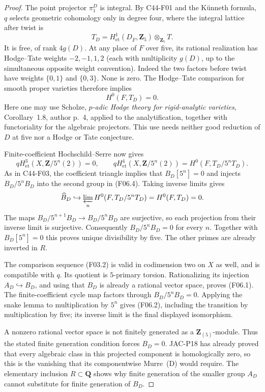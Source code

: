 \begin{proof}
The point projector $\pi_1^D$ is integral.  By C44-F01 and
the K\"unneth formula, $q$ selects geometric cohomology only in
degree four, where the integral lattice after twist is
\[
 T_D=H^1_{\mathrm{et}}(D_{\overline F},\mathbf Z_5)
                  \otimes_{\mathbf Z_5}T.
\]
It is free, of rank $4g(D)$.  At any place of $F$ over five,
its rational realization has Hodge--Tate weights
$-2,-1,1,2$ (each with multiplicity $g(D)$, up to the
simultaneous opposite weight convention).  Indeed the two
factors before twist have weights $\{0,1\}$ and $\{0,3\}$.
None is zero.  The Hodge--Tate comparison for smooth proper
varieties therefore implies
\[
                 H^0(F,T_D)=0.                 \tag{F06.3}
\]
Here one may use Scholze, \emph{$p$-adic Hodge theory for
rigid-analytic varieties}, Corollary~1.8, author p.~4, applied
to the analytification, together with functoriality for the
algebraic projectors.  This use needs neither good reduction
of $D$ at five nor a Hodge or Tate conjecture.

Finite-coefficient Hochschild--Serre now gives
\[
 qH^3_{\mathrm{et}}(X,\mathbf Z/5^n(2))=0,
 \qquad
 qH^4_{\mathrm{et}}(X,\mathbf Z/5^n(2))
       =H^0(F,T_D/5^nT_D).
                                                        \tag{F06.4}
\]
As in C44-F03, the coefficient triangle implies that
$B_D[5^n]=0$ and injects $B_D/5^nB_D$ into the second group
in (F06.4).  Taking inverse limits gives
\[
 \widehat B_D\hookrightarrow
        \varprojlim_n H^0(F,T_D/5^nT_D)
        =H^0(F,T_D)=0.
\]
The maps $B_D/5^{n+1}B_D\to B_D/5^nB_D$ are surjective,
so each projection from their inverse limit is surjective.
Consequently $B_D/5^nB_D=0$ for every $n$.  Together with
$B_D[5^n]=0$ this proves unique divisibility by five.
The other primes are already inverted in $R$.

The comparison sequence (F03.2) is valid in codimension two
on $X$ as well, and is compatible with $q$.  Its quotient
is $5$-primary torsion.  Rationalizing its injection
$A_D\hookrightarrow B_D$, and using that $B_D$ is already
a rational vector space, proves (F06.1).  The finite-coefficient
cycle map factors through $B_D/5^nB_D=0$.  Applying the snake
lemma to multiplication by $5^n$ gives (F06.2), including the
transition by multiplication by five; its inverse limit is
the final displayed isomorphism.

A nonzero rational vector space is not finitely generated as
a $\mathbf Z_{(5)}$-module.  Thus the stated finite generation
condition forces $B_D=0$.  JAC-P18 has already proved that
every algebraic class in this projected component is
homologically zero, so this is the vanishing that its
componentwise Murre~(D) would require.  The elementary inclusion
$R\subset\mathbf Q$ shows why finite generation of the smaller
group $A_D$ cannot substitute for finite generation of $B_D$.
\end{proof}

